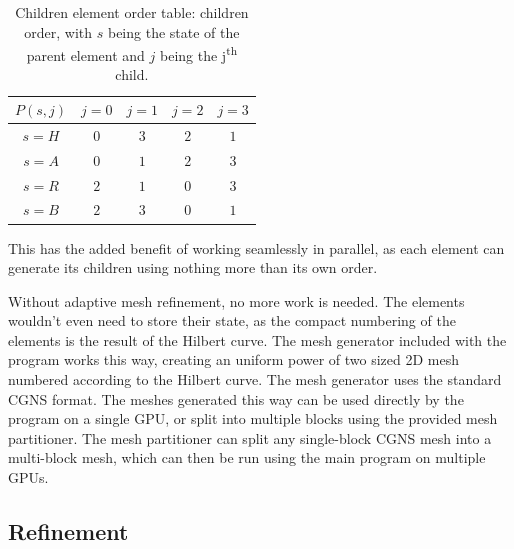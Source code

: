\begin{table}[H]
	\begin{center}
		\begin{tabular}{ c | c c c c} 
			$P\left ( s, j \right )$ & $j = 0$ & $j = 1$ & $j = 2$ & $j = 3$  \\
			\hline
			$s = H$ & \textcolor{vs_red}{$0$} & \textcolor{vs_red}{$3$} & \textcolor{vs_red}{$2$} & \textcolor{vs_red}{$1$} \\ 
			$s = A$ & \textcolor{vs_blue}{$0$} & \textcolor{vs_blue}{$1$} & \textcolor{vs_blue}{$2$} & \textcolor{vs_blue}{$3$} \\
			$s = R$ & \textcolor{vs_teal}{$2$} & \textcolor{vs_teal}{$1$} & \textcolor{vs_teal}{$0$} & \textcolor{vs_teal}{$3$} \\
			$s = B$ & \textcolor{vs_plum}{$2$} & \textcolor{vs_plum}{$3$} & \textcolor{vs_plum}{$0$} & \textcolor{vs_plum}{$1$} \\
		\end{tabular}
		
		\caption{Children element order table: children order, with $s$ being the state of the parent element and $j$ being the j\textsuperscript{th} child.}
		\label{table:children_ordering}
	\end{center}
\end{table}

This has the added benefit of working seamlessly in parallel, as each element can generate its
children using nothing more than its own order.

Without adaptive mesh refinement, no more work is needed. The elements wouldn't even need to store
their state, as the compact numbering of the elements is the result of the Hilbert curve. The mesh
generator included with the program works this way, creating an uniform power of two sized 2D mesh
numbered according to the Hilbert curve. The mesh generator uses the standard CGNS format. The
meshes generated this way can be used directly by the program on a single GPU, or split into
multiple blocks using the provided mesh partitioner. The mesh partitioner can split any single-block
CGNS mesh into a multi-block mesh, which can then be run using the main program on multiple GPUs.

\subsection{Refinement} \label{section:load_balancing:hilbert_curve:refinement}

